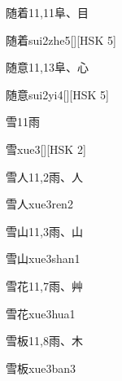 \begin{entry}{随着}{11,11}{⾩、⽬}
  \begin{phonetics}{随着}{sui2zhe5}[][HSK 5]
  \end{phonetics}
\end{entry}

\begin{entry}{随意}{11,13}{⾩、⼼}
  \begin{phonetics}{随意}{sui2yi4}[][HSK 5]
  \end{phonetics}
\end{entry}

\begin{entry}{雪}{11}{⾬}
  \begin{phonetics}{雪}{xue3}[][HSK 2]
  \end{phonetics}
\end{entry}

\begin{entry}{雪人}{11,2}{⾬、⼈}
  \begin{phonetics}{雪人}{xue3ren2}
  \end{phonetics}
\end{entry}

\begin{entry}{雪山}{11,3}{⾬、⼭}
  \begin{phonetics}{雪山}{xue3shan1}
  \end{phonetics}
\end{entry}

\begin{entry}{雪花}{11,7}{⾬、⾋}
  \begin{phonetics}{雪花}{xue3hua1}
  \end{phonetics}
\end{entry}

\begin{entry}{雪板}{11,8}{⾬、⽊}
  \begin{phonetics}{雪板}{xue3ban3}
  \end{phonetics}
\end{entry}

